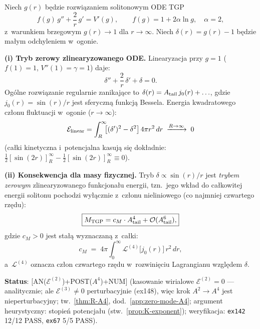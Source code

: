 \begin{proposition}%
\label{prop:J-zero-mode-mass}
Niech $g(r)$ będzie rozwiązaniem solitonowym ODE TGP
\begin{equation}
  f(g)\,g'' + \frac{2}{r}\,g' = V'(g),
  \qquad f(g) = 1 + 2\alpha\ln g,\quad \alpha = 2,
\end{equation}
z~warunkiem brzegowym $g(r) \to 1$ dla $r \to \infty$.
Niech $\delta(r) = g(r) - 1$ będzie małym odchyleniem w~ogonie.

\medskip\noindent
\textbf{(i) Tryb zerowy zlinearyzowanego ODE.}
Linearyzacja przy $g = 1$ ($f(1) = 1$, $V''(1) = \gamma = 1$) daje:
\begin{equation}
  \delta'' + \frac{2}{r}\,\delta' + \delta = 0.
\end{equation}
Ogólne rozwiązanie regularnie zanikające to $\delta(r) = A_{\rm tail}\,j_0(r) + \ldots$,
gdzie $j_0(r) = \sin(r)/r$ jest sferyczną funkcją Bessela.
Energia kwadratowego członu fluktuacji w~ogonie ($r \to \infty$):
\begin{equation}\label{eq:J-zero-mode-energy}
  \mathcal{E}_{\rm linear}
  = \int_R^\infty \!\!\bigl[(\delta')^2 - \delta^2\bigr]\,4\pi r^2\,dr
  \;\xrightarrow{R \to \infty}\; 0
\end{equation}
(całki kinetyczna i~potencjalna kasują się dokładnie:
$\frac{1}{2}[\sin(2r)]_R^\infty - \frac{1}{2}[\sin(2r)]_R^\infty \equiv 0$).

\medskip\noindent
\textbf{(ii) Konsekwencja dla masy fizycznej.}
Tryb $\delta \propto \sin(r)/r$ jest \emph{trybem zerowym} zlinearyzowanego
funkcjonału energii, tzn.\ jego wkład do całkowitej energii solitonu
pochodzi wyłącznie z~członu nieliniowego (co najmniej czwartego rzędu):
\begin{equation}\label{eq:J-mass-Atail4-analytic}
  \boxed{M_{\rm TGP} = c_M \cdot A_{\rm tail}^4 + \mathcal{O}(A_{\rm tail}^6),}
\end{equation}
gdzie $c_M > 0$ jest stałą wyznaczaną z~całki:
\[
  c_M \;=\; 4\pi \int_0^\infty \mathcal{L}^{(4)}\!\bigl[j_0(r)\bigr]\,r^2\,dr,
\]
a~$\mathcal{L}^{(4)}$ oznacza człon czwartego rzędu w~rozwinięciu
Lagrangianu względem $\delta$.

\medskip\noindent
\textbf{Status}:  [AN($\mathcal{E}^{(2)}$)+POST($A^4$)+NUM]
(kasowanie wirialowe $\mathcal{E}^{(2)}=0$ --- analitycznie;
ale $\mathcal{E}^{(3)} \neq 0$ perturbacyjnie (ex148),
więc krok $A^2 \to A^4$ jest nieperturbacyjny;
tw.~\ref{thm:R-A4}, dod.~\ref{app:zero-mode-A4};
argument heurystyczny: stopień potencjału (stw.~\ref{prop:K-exponent});
weryfikacja: \texttt{ex142} 12/12 PASS, \texttt{ex67} 5/5 PASS).
\end{proposition}

